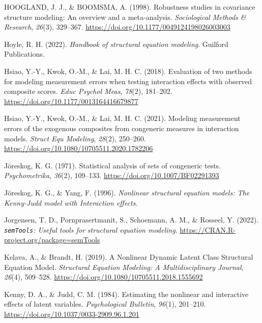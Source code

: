 \documentclass[
  11pt,
  man]{apa6}
\newlength{\cslhangindent}
\newlength{\cslentryspacingunit} %
\newenvironment{CSLReferences}[2] %
 {%
  \setlength{\parindent}{0pt}
  \ifodd #1
  \let\oldpar\par
  \def\par{\hangindent=\cslhangindent\oldpar}
  \fi
  \setlength{\parskip}{#2\cslentryspacingunit}
 }%
 {}
\begin{document}
\begin{CSLReferences}{1}{0}
\leavevmode{}%
HOOGLAND, J. J., \& BOOMSMA, A. (1998). Robustness studies in covariance structure modeling: {An} overview and a meta-analysis. \emph{Sociological Methods \& Research}, \emph{26}(3), 329--367. \url{https://doi.org/10.1177/0049124198026003003}

\leavevmode{}%
Hoyle, R. H. (2022). \emph{Handbook of {structural equation modeling}}. Guilford Publications.

\leavevmode{}%
Hsiao, Y.-Y., Kwok, O.-M., \& Lai, M. H. C. (2018). Evaluation of two methods for modeling measurement errors when testing interaction effects with observed composite scores. \emph{Educ Psychol Meas}, \emph{78}(2), 181--202. \url{https://doi.org/10.1177/0013164416679877}

\leavevmode{}%
Hsiao, Y.-Y., Kwok, O.-M., \& Lai, M. H. C. (2021). Modeling measurement errors of the exogenous composites from congeneric measures in interaction models. \emph{Struct Equ Modeling}, \emph{28}(2), 250--260. \url{https://doi.org/10.1080/10705511.2020.1782206}

\leavevmode{}%
Jöreskog, K. G. (1971). Statistical analysis of sets of congeneric tests. \emph{Psychometrika}, \emph{36}(2), 109--133. \url{https://doi.org/10.1007/BF02291393}

\leavevmode{}%
Jöreskog, K. G., \& Yang, F. (1996). \emph{Nonlinear structural equation models: {The Kenny-Judd} model with {Interaction} effects}.

\leavevmode{}%
Jorgensen, T. D., Pornprasertmanit, S., Schoemann, A. M., \& Rosseel, Y. (2022). \emph{\texttt{semTools}: {U}seful tools for structural equation modeling}. \url{https://CRAN.R-project.org/package=semTools}

\leavevmode{}%
Kelava, A., \& Brandt, H. (2019). A {Nonlinear Dynamic Latent Class Structural Equation Model}. \emph{Structural Equation Modeling: A Multidisciplinary Journal}, \emph{26}(4), 509--528. \url{https://doi.org/10.1080/10705511.2018.1555692}

\leavevmode{}%
Kenny, D. A., \& Judd, C. M. (1984). Estimating the nonlinear and interactive effects of latent variables. \emph{Psychological Bulletin}, \emph{96}(1), 201--210. \url{https://doi.org/10.1037/0033-2909.96.1.201}


\end{CSLReferences}
\end{document}
